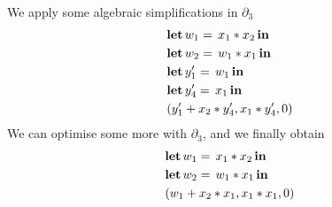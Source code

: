 \begin{example}
\begin{align*}
{{{{{{{{{		}}}}}}}}}
	\end{align*}
	We apply some algebraic simplifications in $\partial_3$
	\begin{align*}
		&\letin{w_1}{\var_1 * \var_2}{\\
		&\letin{w_2}{w_1 * \var_1}{\\
		& \letin{\var[2]_1'}{w_1}{\\
		&\letin{\var[2]_4'}{\var_1}{\\
		&(\var[2]_1'+\var_2*\var[2]_4',\var_1*\var[2]_4',0)
		}}}}
	\end{align*}
	We can optimise some more with $\partial_3$, and we finally obtain
	\begin{align*}
		&\letin{w_1}{\var_1 * \var_2}{\\
		&\letin{w_2}{w_1 * \var_1}{\\
		&(w_1+\var_2*\var_1,\var_1*\var_1,0)
		}}
	\end{align*}
\end{example}